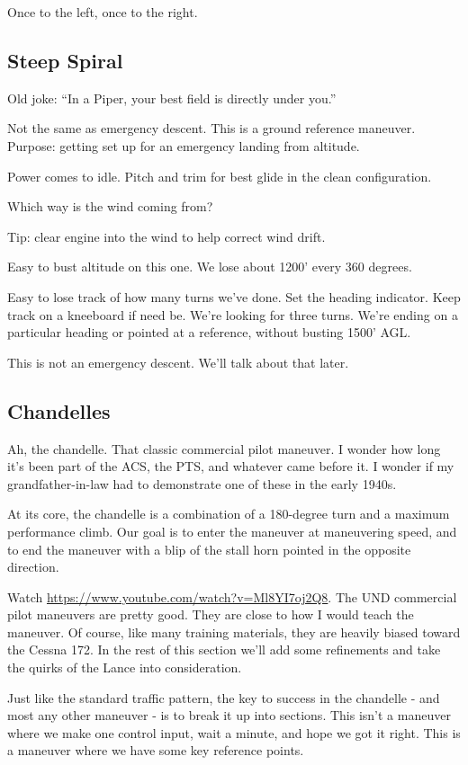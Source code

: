 Once to the left, once to the right.

\subsection{Steep Spiral}

Old joke: ``In a Piper, your best field is directly under you.''

Not the same as emergency descent. This is a ground reference maneuver. Purpose: getting set up for an emergency landing from altitude.

Power comes to idle. Pitch and trim for best glide in the clean configuration.

Which way is the wind coming from?

Tip: clear engine into the wind to help correct wind drift.

Easy to bust altitude on this one. We lose about 1200' every 360 degrees.

Easy to lose track of how many turns we've done. Set the heading indicator. Keep track on a kneeboard if need be. We're looking for three turns. We're ending on a particular heading or pointed at a reference, without busting 1500' AGL.

This is not an emergency descent. We'll talk about that later.

\subsection{Chandelles}

Ah, the chandelle. That classic commercial pilot maneuver. I wonder how long it's been part of the ACS, the PTS, and whatever came before it. I wonder if my grandfather-in-law had to demonstrate one of these in the early 1940s.

At its core, the chandelle is a combination of a 180-degree turn and a maximum performance climb. Our goal is to enter the maneuver at maneuvering speed, and to end the maneuver with a blip of the stall horn pointed in the opposite direction.

Watch \url{https://www.youtube.com/watch?v=Ml8YI7oj2Q8}. The UND commercial pilot maneuvers are pretty good. They are close to how I would teach the maneuver. Of course, like many training materials, they are heavily biased toward the Cessna 172. In the rest of this section we'll add some refinements and take the quirks of the Lance into consideration.

Just like the standard traffic pattern, the key to success in the chandelle - and most any other maneuver - is to break it up into sections. This isn't a maneuver where we make one control input, wait a minute, and hope we got it right. This is a maneuver where we have some key reference points.

